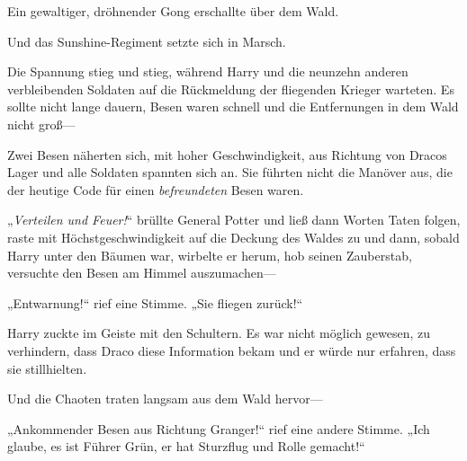 \later

Ein gewaltiger, dröhnender Gong erschallte über dem Wald.

Und das Sunshine-Regiment setzte sich in Marsch.

\later

Die Spannung stieg und stieg, während Harry und die neunzehn anderen verbleibenden Soldaten auf die Rückmeldung der fliegenden Krieger warteten. Es sollte nicht lange dauern, Besen waren schnell und die Entfernungen in dem Wald nicht groß—

Zwei Besen näherten sich, mit hoher Geschwindigkeit, aus Richtung von Dracos Lager und alle Soldaten spannten sich an. Sie führten nicht die Manöver aus, die der heutige Code für einen \emph{befreundeten} Besen waren.

„\emph{Verteilen und Feuer!}“ brüllte General Potter und ließ dann Worten Taten folgen, raste mit Höchstgeschwindigkeit auf die Deckung des Waldes zu und dann, sobald Harry unter den Bäumen war, wirbelte er herum, hob seinen Zauberstab, versuchte den Besen am Himmel auszumachen—

„Entwarnung!“ rief eine Stimme. „Sie fliegen zurück!“

Harry zuckte im Geiste mit den Schultern. Es war nicht möglich gewesen, zu verhindern, dass Draco diese Information bekam und er würde nur erfahren, dass sie stillhielten.

Und die Chaoten traten langsam aus dem Wald hervor—

„Ankommender Besen aus Richtung Granger!“ rief eine andere Stimme. „Ich glaube, es ist Führer Grün, er hat Sturzflug und Rolle gemacht!“

